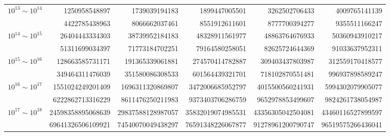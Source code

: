\documentclass{article}
\begin{document}
\begin{center}
\begin{tabular}{>{\raggedright\arraybackslash}p{2.2cm} *{5}{r}}
\midrule
$10^{13}\sim10^{14}$ & 1250958548897 & 1739039194183 & 1899447005501 & 3262502706433 & 4009765141139 \\
                     & 4422785438963 & 8066662037461 & 8551912611601 & 8777700394277 & 9355511166247\\
\midrule
$10^{14}\sim10^{15}$ & 26404443334303 & 38739952184183 & 48328911561977 & 48863764676933 & 50360943910217 \\
                     & 51311699034397 & 71773184702251 & 79164580258051 & 82625724644369 & 91033637952311\\
\midrule
$10^{15}\sim10^{16}$ & 128663585731171 & 191365339061881 & 274570414782887 & 309403437803987 & 312559170418577 \\
                     & 349464311476039 & 351580086308533 & 601564439321701 & 718102870551481 & 996937898589247\\
\midrule
$10^{16}\sim10^{17}$ & 1551024249201409 & 1696311320869807 & 3472006685952797 & 4015500560241931 & 5994302079905077 \\
                     & 6222862713316229 & 8611476250211983 & 9373403706286759 & 9652978853499607 & 9824261738054987\\
\midrule
$10^{17}\sim10^{18}$ & 24598358895068639 & 29837588128987057 & 35832019074985531 & 43356305042504081 & 43460116527899597 \\
                     & 69641326506109921 & 74540070049438297 & 76591348226067877 & 91278961200790747 & 96519575266436041\\
\bottomrule
\end{tabular}
\end{center}
\end{document}

